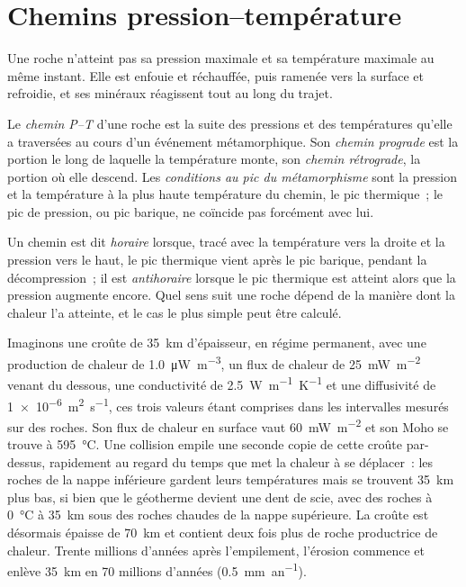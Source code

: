 \section{Chemins pression--température}\label{sec:b2:pt-paths:paths}

Une roche n'atteint pas sa pression maximale et sa température maximale au même instant.
Elle est enfouie et réchauffée, puis ramenée vers la surface et refroidie, et ses minéraux réagissent tout
au long du trajet.

\begin{definition}\label{def:b2:pt-paths:paths}
Le \emph{chemin P--T} d'une roche est la suite des pressions et
des températures qu'elle a traversées au cours d'un événement métamorphique. Son \emph{chemin
prograde} est la portion le long de laquelle la température monte, son \emph{chemin
rétrograde}, la portion où elle descend. Les \emph{conditions
au pic du métamorphisme} sont la pression et la température à la
plus haute température du chemin, le pic thermique~; le pic de pression, ou pic barique, ne
coïncide pas forcément avec lui.
\end{definition}

Un chemin est dit \emph{horaire} lorsque, tracé avec la température vers la droite et la pression vers le haut,
le pic thermique vient après le pic barique, pendant la décompression~; il est
\emph{antihoraire} lorsque le pic thermique est atteint alors que la pression augmente encore. Quel
sens suit une roche dépend de la manière dont la chaleur l'a atteinte, et le cas le plus simple peut être
calculé.

Imaginons une croûte de \qty{35}{km} d'épaisseur, en régime permanent, avec une production de chaleur de
\qty{1.0}{\micro W.m^{-3}}, un flux de chaleur de \qty{25}{mW.m^{-2}} venant du dessous, une conductivité
de \qty{2.5}{W.m^{-1}.K^{-1}} et une diffusivité de \qty{1e-6}{m^2.s^{-1}}, ces trois valeurs
étant comprises dans les intervalles mesurés sur des roches. Son flux de chaleur en surface vaut \qty{60}{mW.m^{-2}} et son Moho se trouve à
\qty{595}{\celsius}. Une collision empile une seconde copie de cette croûte par-dessus, rapidement
au regard du temps que met la chaleur à se déplacer~: les roches de la nappe inférieure gardent leurs
températures mais se trouvent \qty{35}{km} plus bas, si bien que le géotherme devient une dent de scie, avec
des roches à \qty{0}{\celsius} à \qty{35}{km} sous des roches chaudes de la nappe supérieure. La croûte est
désormais épaisse de \qty{70}{km} et contient deux fois plus de roche productrice de chaleur. Trente millions d'années après
l'empilement, l'érosion commence et enlève \qty{35}{km} en 70 millions d'années
(\qty{0.5}{mm.an^{-1}}).

